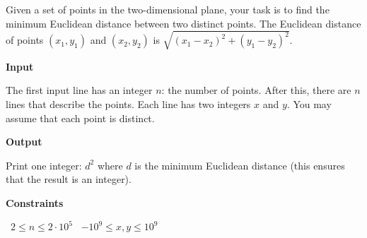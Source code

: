 Given a set of points in the two-dimensional plane, your task is to find the minimum Euclidean distance between two distinct points.
The Euclidean distance of points $(x_1,y_1)$ and $(x_2,y_2)$ is $\sqrt{(x_1-x_2)^2+(y_1-y_2)^2}$.

\vspace{0.3cm}\noindent\textbf{Input}

The first input line has an integer $n$: the number of points.
After this, there are $n$ lines that describe the points. Each line has two integers $x$ and $y$. You may assume that each point is distinct.

\vspace{0.3cm}\noindent\textbf{Output}

Print one integer: $d^2$ where $d$ is the minimum Euclidean distance (this ensures that the result is an integer).

\vspace{0.3cm}\noindent\textbf{Constraints}

\textbullet\ $2 \le n \le 2 \cdot 10^5$
\textbullet\ $-10^9 \le x,y \le 10^9$